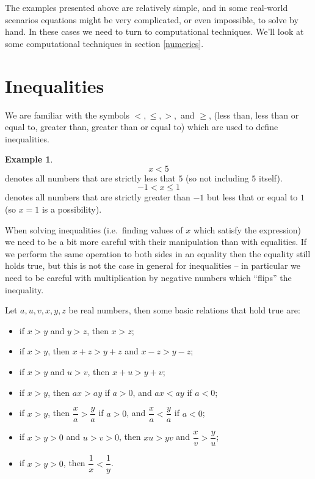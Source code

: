 \documentclass[
]{book}
\providecommand{\tightlist}{%
  \setlength{\itemsep}{0pt}\setlength{\parskip}{0pt}}
\theoremstyle{definition}
\theoremstyle{definition}
\newtheorem{example}{Example}[chapter]
\theoremstyle{definition}
\theoremstyle{definition}
\theoremstyle{remark}
\begin{document}
The examples presented above are relatively simple, and in some real-world scenarios equations might be very complicated, or even impossible, to solve by hand. In these cases we need to turn to computational techniques. We'll look at some computational techniques in section \ref{numerics}.

\hypertarget{inequalities}{%
\section{Inequalities}\label{inequalities}}

We are familiar with the symbols \(<, \leq, >,\) and \(\geq\), (less than, less than or equal to, greater than, greater than or equal to) which are used to define inequalities.

\begin{example}
\protect\hypertarget{exm:ineqs}{}\label{exm:ineqs}\[x<5\] denotes all numbers that are strictly less that \(5\) (so not including \(5\) itself).
\[-1< x \leq 1\] denotes all numbers that are strictly greater than \(-1\) but less that or equal to \(1\) (so \(x=1\) is a possibility).
\end{example}

When solving inequalities (i.e.~finding values of \(x\) which satisfy the expression) we need to be a bit more careful with their manipulation than with equalities. If we perform the same operation to both sides in an equality then the equality still holds true, but this is not the case in general for inequalities -- in particular we need to be careful with multiplication by negative numbers which ``flips'' the inequality.

Let \(a,u,v,x,y,z\) be real numbers, then some basic relations that hold true are:

\begin{itemize}
\tightlist
\item
  if \(x>y\) and \(y>z\), then \(x>z\);
\item
  if \(x>y\), then \(x+z>y+z\) and \(x-z>y-z\);
\item
  if \(x>y\) and \(u>v\), then \(x+u>y+v\);
\item
  if \(x>y\), then \(ax>ay\) if \(a>0\), and \(ax < ay\) if \(a<0\);
\item
  if \(x>y\), then \(\dfrac{x}{a}>\dfrac{y}{a}\) if \(a>0\), and \(\dfrac{x}{a}<\dfrac{y}{a}\) if \(a<0\);
\item
  if \(x>y>0\) and \(u>v>0\), then \(xu>yv\) and \(\dfrac{x}{v}>\dfrac{y}{u}\);
\item
  if \(x>y>0\), then \(\dfrac{1}{x}<\dfrac{1}{y}\).
\end{itemize}
\end{document}
